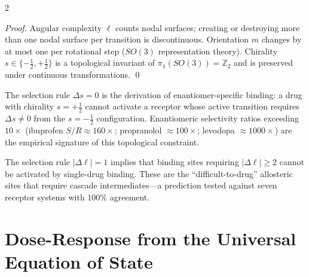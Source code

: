 \begin{multicols}{2}
\begin{proof}
Angular complexity $\ell$ counts nodal surfaces; creating or destroying more than one nodal surface per transition is discontinuous. Orientation $m$ changes by at most one per rotational step ($SO(3)$ representation theory). Chirality $s \in \{-\frac{1}{2}, +\frac{1}{2}\}$ is a topological invariant of $\pi_1(SO(3)) = \mathbb{Z}_2$ and is preserved under continuous transformations. \qed
\end{proof}

The selection rule $\Delta s = 0$ is the derivation of enantiomer-specific binding: a drug with chirality $s = +\frac{1}{2}$ cannot activate a receptor whose active transition requires $\Delta s \neq 0$ from the $s = -\frac{1}{2}$ configuration. Enantiomeric selectivity ratios exceeding $10\times$ (ibuprofen $S/R \approx 160\times$; propranolol $\approx 100\times$; levodopa $\approx 1000\times$) are the empirical signature of this topological constraint.

The selection rule $|\Delta\ell| = 1$ implies that binding sites requiring $|\Delta\ell| \geq 2$ cannot be activated by single-drug binding. These are the ``difficult-to-drug'' allosteric sites that require cascade intermediates---a prediction tested against seven receptor systems with 100\% agreement.

\end{multicols}

\section{Dose-Response from the Universal Equation of State}
\label{sec:ch12_doseresponse}

